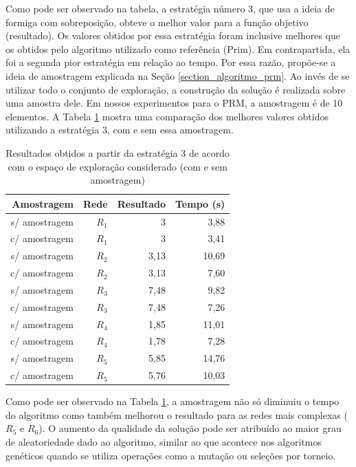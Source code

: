 Como pode ser observado na tabela, a estratégia número 3, que usa a ideia de formiga com sobreposição, obteve o melhor valor para a função objetivo (resultado). Os valores obtidos por essa estratégia foram inclusive melhores que os obtidos pelo algoritmo utilizado como referência (Prim). Em contrapartida, ela foi a segunda pior estratégia em relação ao tempo. Por essa razão, propõe-se a ideia de amostragem explicada na Seção \ref{section_algoritmo_prm}. Ao invés de se utilizar todo o conjunto de exploração, a construção da solução é realizada sobre uma amostra dele. Em nossos experimentos para o PRM, a amostragem é de 10 elementos. A Tabela \ref{tab_exp2_amostragem} mostra uma comparação dos melhores valores obtidos utilizando a estratégia 3, com e sem essa amostragem.

\begin{table}[!htbp]
	\centering
	\caption{Resultados obtidos a partir da estratégia 3 de acordo com o espaço de exploração considerado (com e sem amostragem)}
	\label{tab_exp2_amostragem}
	\begin{tabular}{rrrr}
		Amostragem    & Rede & Resultado   & Tempo (s) \\ \hline
		s/ amostragem & $R_1$    & 3 & 3,88      \\
		\rowcolor{table-green}
		c/ amostragem & $R_1$    & 3 & 3,41      \\ \hline
		s/ amostragem & $R_2$    & 3,13 & 10,69    \\
		\rowcolor{table-green}
		c/ amostragem & $R_2$    & 3,13 & 7,60     \\ \hline
		s/ amostragem & $R_3$    & 7,48 & 9,82     \\
		\rowcolor{table-green}
		c/ amostragem & $R_3$    & 7,48 & 7,26      \\ \hline
		s/ amostragem & $R_4$    & 1,85 & 11,01    \\
		\rowcolor{table-green}
		c/ amostragem & $R_4$    & 1,78 & 7,28      \\ \hline
		s/ amostragem & $R_5$    & 5,85 & 14,76    \\
		\rowcolor{table-green}
		c/ amostragem & $R_5$    & 5,76  & 10,03    \\ \hline
	\end{tabular}
\end{table}

Como pode ser observado na Tabela \ref{tab_exp2_amostragem}, a amostragem não só diminuiu o tempo do algoritmo como também melhorou o resultado para as redes mais complexas ($R_5$ e $R_6$). O aumento da qualidade da solução pode ser atribuído ao maior grau de aleatoriedade dado ao algoritmo, similar ao que acontece nos algoritmos genéticos quando se utiliza operações como a mutação ou seleções por torneio.

